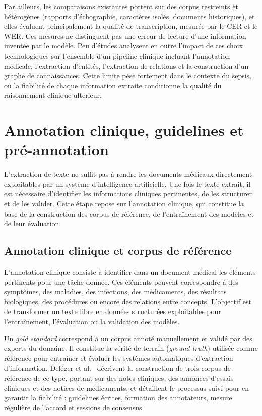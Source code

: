 Par ailleurs, les comparaisons existantes portent sur des corpus restreints et hétérogènes (rapports d'échographie, caractères isolés, documents historiques), et elles évaluent principalement la qualité de transcription, mesurée par le CER et le WER. Ces mesures ne distinguent pas une erreur de lecture d'une information inventée par le modèle. Peu d'études analysent en outre l'impact de ces choix technologiques sur l'ensemble d'un pipeline clinique incluant l'annotation médicale, l'extraction d'entités, l'extraction de relations et la construction d'un graphe de connaissances. Cette limite pèse fortement dans le contexte du sepsis, où la fiabilité de chaque information extraite conditionne la qualité du raisonnement clinique ultérieur.

\section{Annotation clinique, guidelines et pré-annotation}

L'extraction de texte ne suffit pas à rendre les documents médicaux directement exploitables par un système d'intelligence artificielle. Une fois le texte extrait, il est nécessaire d'identifier les informations cliniques pertinentes, de les structurer et de les valider. Cette étape repose sur l'annotation clinique, qui constitue la base de la construction des corpus de référence, de l'entraînement des modèles et de leur évaluation.

\subsection{Annotation clinique et corpus de référence}

L'annotation clinique consiste à identifier dans un document médical les éléments pertinents pour une tâche donnée. Ces éléments peuvent correspondre à des symptômes, des maladies, des infections, des médicaments, des résultats biologiques, des procédures ou encore des relations entre concepts. L'objectif est de transformer un texte libre en données structurées exploitables pour l'entraînement, l'évaluation ou la validation des modèles.

Un \textit{gold standard} correspond à un corpus annoté manuellement et validé par des experts du domaine. Il constitue la vérité de terrain (\textit{ground truth}) utilisée comme référence pour entraîner et évaluer les systèmes automatiques d'extraction d'information. Deléger et al.~\cite{deleger2012building} décrivent la construction de trois corpus de référence de ce type, portant sur des notes cliniques, des annonces d'essais cliniques et des notices de médicaments, et détaillent le processus suivi pour en garantir la fiabilité : guidelines écrites, formation des annotateurs, mesure régulière de l'accord et sessions de consensus.

